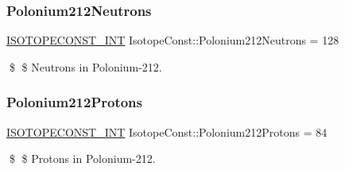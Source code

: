 \subsubsection{\texorpdfstring{Polonium212\+Neutrons}{Polonium212Neutrons}}
{\footnotesize\ttfamily \mbox{\hyperlink{group___isotope_const-_macros_ga5f18360b3e99483a35c32d789e62621c}{I\+S\+O\+T\+O\+P\+E\+C\+O\+N\+S\+T\+\_\+\+I\+NT}} Isotope\+Const\+::\+Polonium212\+Neutrons = 128}

\$ \$ Neutrons in Polonium-\/212. \mbox{\label{group___isotope_const-_polonium-_po212_gaa10b4c0c62d0e345e3ee13a9b105b231}} 
\subsubsection{\texorpdfstring{Polonium212\+Protons}{Polonium212Protons}}
{\footnotesize\ttfamily \mbox{\hyperlink{group___isotope_const-_macros_ga5f18360b3e99483a35c32d789e62621c}{I\+S\+O\+T\+O\+P\+E\+C\+O\+N\+S\+T\+\_\+\+I\+NT}} Isotope\+Const\+::\+Polonium212\+Protons = 84}

\$ \$ Protons in Polonium-\/212. 